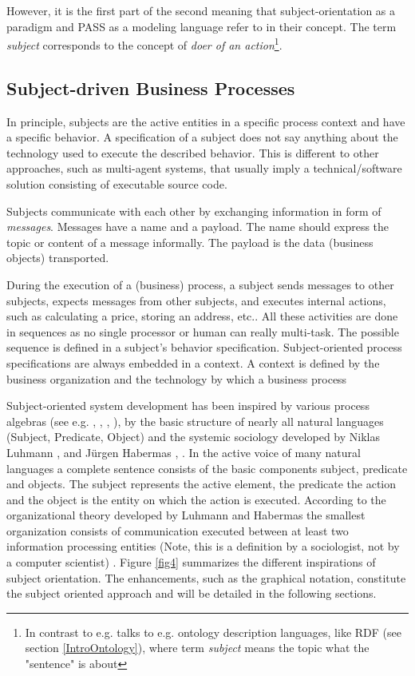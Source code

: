 However, it is the first part of the second meaning that subject-orientation as a paradigm and PASS as a modeling language refer to in their concept. The term \textit{subject} corresponds to the concept of \textit{doer of an action}\footnote{In contrast to e.g. talks to e.g. ontology description languages, like RDF  (see section \ref{IntroOntology}), where term \textit{subject} means the topic what the "sentence" is about}.

\subsection{Subject-driven Business Processes}

In principle, subjects are the active entities in a specific process context and have a specific behavior. A specification of a subject does not say anything about the technology used to execute the described behavior. This is different to other approaches, such as multi-agent systems, that usually imply a technical/software solution consisting of executable source code.

Subjects communicate with each other by exchanging information in form of \textit{messages}. Messages have a name and a payload. The name should express the topic or content of a message informally. The payload is the data (business objects) transported. 

During the execution of a (business) process, a subject sends messages to other subjects, expects messages from other subjects, and executes internal actions, such as calculating a price, storing an address, etc.. All these activities are done in sequences as no single processor or human can really multi-task. The possible sequence is defined in a subject's behavior specification. Subject-oriented process specifications are always embedded in a context. A context is defined by the business organization and the technology by which a business process


Subject-oriented system development has been inspired by various process algebras (see e.g. \cite{book:S-BPM}, \cite{book:CCS}, \cite{book:Pi-Calculus}, \cite{book:CSP} ), by the basic structure of nearly all natural languages (Subject, Predicate, Object) and the systemic sociology developed by Niklas Luhmann \cite{book:LuhmannLeicht},\cite{book:Luhmann}  and J\"urgen Habermas \cite{book:HabermasLeicht}, \cite{book:Habermas}. In the active voice of many natural languages a complete sentence consists of the basic components subject, predicate and objects. The subject represents the active element, the predicate the action and the object is the entity on which the action is executed. According to the organizational theory developed by Luhmann and Habermas the smallest organization consists of communication executed between at least two information processing entities (Note, this is a definition by a sociologist, not by a computer scientist) \cite{book:Luhmann}. Figure \ref{fig4} summarizes the different inspirations of subject orientation. The enhancements, such as the graphical notation, constitute the subject oriented approach and will be detailed in the following sections.

